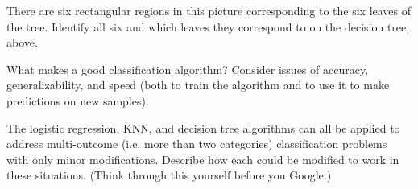 \vspace{5mm}

\begin{question}{}
There are six rectangular regions in this picture corresponding to the six leaves of the tree. Identify all six and which leaves they correspond to on the decision tree, above.
\end{question}

\begin{question}{}
What makes a good classification algorithm? Consider issues of accuracy, generalizability, and speed (both to train the algorithm and to use it to make predictions on new samples). 
\end{question}

\begin{question}{}
The logistic regression, KNN, and decision tree algorithms can all be applied to address multi-outcome (i.e. more than two categories) classification problems with only minor modifications. Describe how each could be modified to work in these situations. (Think through this yourself before you Google.)
\end{question}

